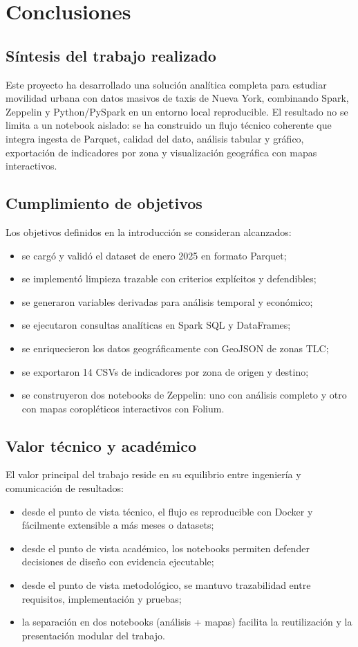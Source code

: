 \chapter{Conclusiones}\label{cap:conclusiones}

\section{Síntesis del trabajo realizado}
Este proyecto ha desarrollado una solución analítica completa para estudiar movilidad
urbana con datos masivos de taxis de Nueva York, combinando Spark, Zeppelin y
Python/PySpark en un entorno local reproducible. El resultado no se limita a un
notebook aislado: se ha construido un flujo técnico coherente que integra ingesta
de Parquet, calidad del dato, análisis tabular y gráfico, exportación de indicadores
por zona y visualización geográfica con mapas interactivos.

\section{Cumplimiento de objetivos}
Los objetivos definidos en la introducción se consideran alcanzados:
\begin{itemize}
	\item se cargó y validó el dataset de enero 2025 en formato Parquet;
	\item se implementó limpieza trazable con criterios explícitos y defendibles;
	\item se generaron variables derivadas para análisis temporal y económico;
	\item se ejecutaron consultas analíticas en Spark SQL y DataFrames;
	\item se enriquecieron los datos geográficamente con GeoJSON de zonas TLC;
	\item se exportaron 14 CSVs de indicadores por zona de origen y destino;
	\item se construyeron dos notebooks de Zeppelin: uno con análisis completo
	y otro con mapas coropléticos interactivos con Folium.
\end{itemize}

\section{Valor técnico y académico}
El valor principal del trabajo reside en su equilibrio entre ingeniería y
comunicación de resultados:
\begin{itemize}
	\item desde el punto de vista técnico, el flujo es reproducible con Docker y
	fácilmente extensible a más meses o datasets;
	\item desde el punto de vista académico, los notebooks permiten defender
	decisiones de diseño con evidencia ejecutable;
	\item desde el punto de vista metodológico, se mantuvo trazabilidad entre
	requisitos, implementación y pruebas;
	\item la separación en dos notebooks (análisis + mapas) facilita la
	reutilización y la presentación modular del trabajo.
\end{itemize}

